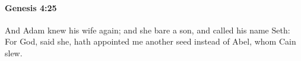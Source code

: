 			\begin{framed}
			\scriptsize
				\begin{compactdesc}
					\item[LXX] 
				\end{compactdesc}
			\end{framed}

		\paragraph{Genesis 4:25} %
			\label{GENESIS-4-25}

			And Adam knew his wife again; and she bare a son, and called his name Seth: For God, said she, hath appointed me another seed instead of Abel, whom Cain slew.



